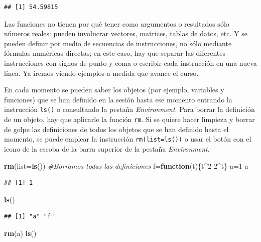 \documentclass[]{book}
\newenvironment{Shaded}{\begin{snugshade}}{\end{snugshade}}
\newcommand{\CommentTok}[1]{\textcolor[rgb]{0.56,0.35,0.01}{\textit{#1}}}
\newcommand{\ControlFlowTok}[1]{\textcolor[rgb]{0.13,0.29,0.53}{\textbf{#1}}}
\newcommand{\DataTypeTok}[1]{\textcolor[rgb]{0.13,0.29,0.53}{#1}}
\newcommand{\DecValTok}[1]{\textcolor[rgb]{0.00,0.00,0.81}{#1}}
\newcommand{\KeywordTok}[1]{\textcolor[rgb]{0.13,0.29,0.53}{\textbf{#1}}}
\newcommand{\NormalTok}[1]{#1}
\newcommand{\OperatorTok}[1]{\textcolor[rgb]{0.81,0.36,0.00}{\textbf{#1}}}
\theoremstyle{definition}
\theoremstyle{definition}
\theoremstyle{definition}
\theoremstyle{remark}
\begin{document}
\begin{verbatim}
## [1] 54.59815
\end{verbatim}

Las funciones no tienen por qué tener como argumentos o resultados sólo números reales: pueden involucrar vectores, matrices, tablas de datos, etc.
Y se pueden definir por medio de secuencias de instrucciones, no sólo mediante fórmulas numéricas directas; en este caso,
hay que separar las diferentes instrucciones con signos de punto y coma o escribir cada instrucción en una nueva línea.
Ya iremos viendo ejemplos a medida que avance el curso.

En cada momento se pueden saber los objetos (por ejemplo, variables y funciones) que se han definido en la sesión hasta ese momento entrando
la instrucción \texttt{ls()} o consultando la pestaña \emph{Environment}.
Para borrar la definición de un objeto, hay que aplicarle la función \texttt{rm}.
Si se quiere hacer limpieza y borrar de golpe las definiciones de todos los objetos que se han definido hasta el momento,
se puede emplear la instrucción \texttt{rm(list=ls())} o usar el botón con el icono de la escoba de la barra superior de la pestaña \emph{Environment}.

\begin{Shaded}
\begin{Highlighting}[]
\KeywordTok{rm}\NormalTok{(}\DataTypeTok{list=}\KeywordTok{ls}\NormalTok{())    }\CommentTok{#Borramos todas las definiciones}
\NormalTok{f=}\ControlFlowTok{function}\NormalTok{(t)\{t}\OperatorTok{^}\DecValTok{2-2}\OperatorTok{^}\NormalTok{t\}}
\NormalTok{a=}\DecValTok{1}
\NormalTok{a}
\end{Highlighting}
\end{Shaded}

\begin{verbatim}
## [1] 1
\end{verbatim}

\begin{Shaded}
\begin{Highlighting}[]
\KeywordTok{ls}\NormalTok{()}
\end{Highlighting}
\end{Shaded}

\begin{verbatim}
## [1] "a" "f"
\end{verbatim}

\begin{Shaded}
\begin{Highlighting}[]
\KeywordTok{rm}\NormalTok{(a)}
\KeywordTok{ls}\NormalTok{()}
\end{Highlighting}
\end{Shaded}
\end{document}
